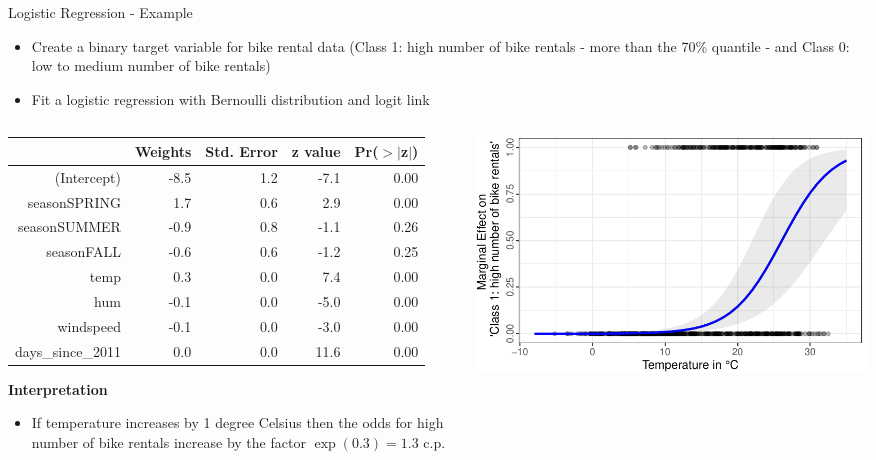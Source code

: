 \documentclass[11pt,compress,t,notes=noshow, aspectratio=169, xcolor=table]{beamer}
\begin{document}
\begin{frame}{Logistic Regression - Example}

\begin{itemize}
    \item Create a binary target variable for bike rental data (Class 1: high number of bike rentals - more than the 70\% quantile - and Class 0: low to medium number of bike rentals)
    \item Fit a logistic regression with Bernoulli distribution and logit link
\end{itemize}

\begin{columns}[T]
\begin{column}{0.45\textwidth}
\begin{table}[ht]
\centering
\tiny
\begin{tabular}{rrrrr}
  \hline
 & Weights & Std. Error & z value & Pr($>$$|$z$|$) \\ 
  \hline
(Intercept) & -8.5 & 1.2 & -7.1 & 0.00 \\ 
  seasonSPRING & 1.7 & 0.6 & 2.9 & 0.00 \\ 
  seasonSUMMER & -0.9 & 0.8 & -1.1 & 0.26 \\ 
  seasonFALL & -0.6 & 0.6 & -1.2 & 0.25 \\ 
  temp & 0.3 & 0.0 & 7.4 & 0.00 \\ 
  hum & -0.1 & 0.0 & -5.0 & 0.00 \\ 
  windspeed & -0.1 & 0.0 & -3.0 & 0.00 \\ 
  days\_since\_2011 & 0.0 & 0.0 & 11.6 & 0.00 \\ 
   \hline
\end{tabular}
\end{table}
\pause
\textbf{Interpretation}
\begin{itemize}
    \item If temperature increases by 1 degree Celsius then the odds for high number of bike rentals increase by the factor $\exp (0.3) = 1.3$ c.p.
\end{itemize}
\end{column}
\hfill
\pause
\begin{column}{0.5\textwidth}
\includegraphics[width = \textwidth]{figure/logistic_maginal_temp.pdf}

\end{column}
\end{columns}
\end{frame}
\end{document}
